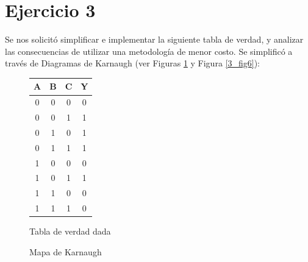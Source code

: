 \part*{Ejercicio 3}

Se nos solicitó simplificar e implementar la siguiente tabla de verdad, y analizar las consecuencias de utilizar una metodología de menor costo. Se simplificó a través de Diagramas de Karnaugh (ver Figuras \ref{3_fig2} y Figura \ref{3_fig6}):


\begin{figure}[H]
\begin{center}
  \begin{minipage}[b]{0.4\textwidth}
  	\begin{center}
  		\begin{tabular}{ccc|c}
A & B & C & Y \\ 
\hline
0 & 0 & 0 & 0 \\  
0 & 0 & 1 & 1 \\  
0 & 1 & 0 & 1 \\  
0 & 1 & 1 & 1 \\  
1 & 0 & 0 & 0 \\  
1 & 0 & 1 & 1 \\  
1 & 1 & 0 & 0 \\  
1 & 1 & 1 & 0 \\  
\end{tabular} 
  	\end{center}
  \caption{Tabla de verdad dada} 
  \label{3_fig1}
  \end{minipage}
  \begin{minipage}[b]{0.4\textwidth}
    \begin{center}
  		\begin{Karnaughvuit}
   \indeterminats{}
\end{Karnaughvuit}
	\end{center}
  \caption{Mapa de Karnaugh} 
  \label{3_fig2}
 \end{minipage}
\end{center}
\end{figure}



